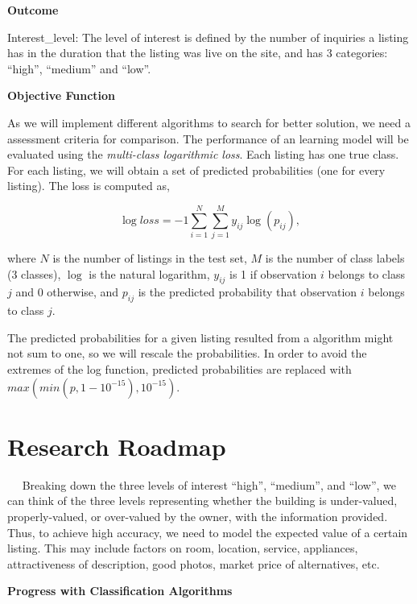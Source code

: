 \documentclass{article}
\begin{document}
\noindent\textbf{\large Outcome} 

Interest\_level: The level of interest is defined by the number of inquiries a listing has in the duration that the listing was live on the site, and has 3 categories: ``high'', ``medium'' and ``low''.
\vspace{2.0em}

\noindent\textbf{\large Objective Function} 

As we will implement different algorithms to search for better solution, we need a assessment criteria for comparison. The performance of an learning model will be evaluated using the \textit{multi-class logarithmic loss}. Each listing has one true class. For each listing, we will obtain a set of predicted probabilities (one for every listing). The loss is computed as,

$$
\log loss=-1\sum_{i=1}^{N}\sum_{j=1}^{M} y_{ij}\log(p_{ij}),
$$

where $N$ is the number of listings in the test set, $M$ is the number of class labels (3 classes),  $\log$ is the natural logarithm, $y_{ij}$ is 1 if observation $i$ belongs to class $j$ and 0 otherwise, and $p_{ij}$ is the predicted probability that observation $i$ belongs to class $j$.

The predicted probabilities for a given listing resulted from a algorithm might not sum to one, so we will rescale the probabilities. In order to avoid the extremes of the log function, predicted probabilities are replaced with $max\left(min(p,1-10^{-15}),10^{-15}\right)$.


\section{Research Roadmap} 
~~ Breaking down the three levels of interest ``high'', ``medium'', and ``low'', we can think of the three levels representing whether the building is under-valued, properly-valued, or over-valued by the owner, with the information provided. Thus, to achieve high accuracy, we need to model the expected value of a certain listing. This may include factors on room, location, service, appliances, attractiveness of description, good photos, market price of alternatives, etc.
\vspace{1.0em}

\noindent\textbf{\large Progress with Classification Algorithms} 
\end{document}
